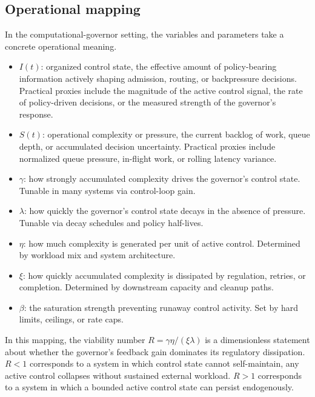 \documentclass[11pt]{article}
\begin{document}
\subsection{Operational mapping}
In the computational-governor setting, the variables and parameters take a concrete operational meaning.
\begin{itemize}
  \item $I(t)$: organized control state, the effective amount of policy-bearing information actively shaping admission, routing, or backpressure decisions. Practical proxies include the magnitude of the active control signal, the rate of policy-driven decisions, or the measured strength of the governor's response.
  \item $S(t)$: operational complexity or pressure, the current backlog of work, queue depth, or accumulated decision uncertainty. Practical proxies include normalized queue pressure, in-flight work, or rolling latency variance.
  \item $\gamma$: how strongly accumulated complexity drives the governor's control state. Tunable in many systems via control-loop gain.
  \item $\lambda$: how quickly the governor's control state decays in the absence of pressure. Tunable via decay schedules and policy half-lives.
  \item $\eta$: how much complexity is generated per unit of active control. Determined by workload mix and system architecture.
  \item $\xi$: how quickly accumulated complexity is dissipated by regulation, retries, or completion. Determined by downstream capacity and cleanup paths.
  \item $\beta$: the saturation strength preventing runaway control activity. Set by hard limits, ceilings, or rate caps.
\end{itemize}
In this mapping, the viability number $R=\gamma\eta/(\xi\lambda)$ is a dimensionless statement about whether the governor's feedback gain dominates its regulatory dissipation. $R<1$ corresponds to a system in which control state cannot self-maintain, any active control collapses without sustained external workload. $R>1$ corresponds to a system in which a bounded active control state can persist endogenously.
\end{document}

